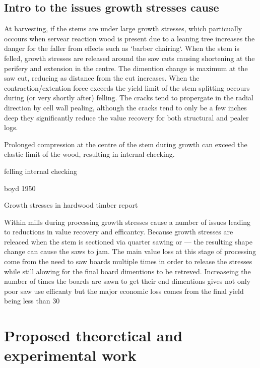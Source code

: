 \documentclass{article}
\begin{document}
\subsection{Intro to the issues growth stresses cause }

At harvesting, if the stems are under large growth stresses, which particually
occours when servear reaction wood is present due to a leaning tree
increases the danger for the faller from effects such as `barber chairing`. When
the stem is felled, growth stresses are released around the saw cuts causing
shortening at the perifery and extension in the centre. The dimention change is
maximum at the saw cut, reducing as distance from the cut increases. When
the contraction/extention force exceeds the yield limit of the stem
splitting occours during (or very shortly after) felling. The cracks tend to
propergate in the radial direction by cell wall pealing, although the cracks
tend to only be a few inches deep they significantly reduce the value recovery
for both structural and pealer logs.

Prolonged compression at the centre of the stem during growth can exceed the
elastic limit of the wood, resulting in internal checking.

felling internal checking

boyd 1950

Growth stresses in hardwood timber report

Within mills during processing growth stresses cause a number of issues leading
to reductions in value recovery and efficantcy. Because growth stresses are
releaced when the stem is sectioned via quarter sawing or --- the resulting
shape change can cause the saws to jam. The main value loss at this stage of
processing come from the need to saw boards multiple times in order to release
the stresses while still alowing for the final board dimentions to be retreved.
Increaseing the number of times the boards are sawn to get their end dimentions
gives not only poor saw use efficanty but the major economic loss comes from the
final yield being less than 30%


\section{Proposed theoretical and experimental work}
\end{document}
